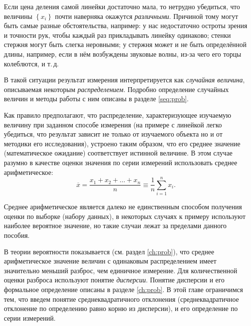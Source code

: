 Если цена деления самой линейки достаточно мала, то нетрудно убедиться, что величины $\left\{ x_{i}\right\} $
почти наверняка окажутся \emph{различными}. Причиной тому могут быть
самые разные обстоятельства, например: у нас недостаточно остроты
зрения и точности рук, чтобы каждый раз прикладывать линейку одинаково;
стенки стержня могут быть слегка неровными; у стержня может и не быть
определённой длины, например, если в нём возбуждены звуковые волны,
из-за чего его торцы колеблются, и т.\,д.

В такой ситуации результат измерения интерпретируется как \emph{случайная величина}, описываемая некоторым \emph{распределением}. Подробно определение случайных величин и методы работы с ним описаны в разделе \ref{seq:prob}.

Как правило предполагают, что распределение, характеризующее изучаемую величину при заданном способе измерения (на примере с линейкой легко убедиться, что результат зависит не только от изучаемого объекта но и от методики его исследования), устроено таким образом, что его среднее значение (математическое ожидание) соответствует истинной величине. 
В этом случае разумно в качестве оценки значения по серии измерений использовать среднее арифметическое:
\begin{equation}
    \overline{x}=\frac{x_{1}+x_{2}+\ldots+x_{n}}{n}\equiv\frac{1}{n}\sum\limits _{i=1}^{n}x_{i}\label{eq:average}.
\end{equation}

Среднее арифметическое является далеко не единственным способом получения оценки по выборке (набору данных), в некоторых случаях к примеру используют наиболее вероятное значение, но такие случаи лежат за пределами данного пособия.

В теории вероятности показывается (см. раздел \ref{ch:prob}), что среднее арифметическое значение величин с одинаковым распределением имеет значительно меньший разброс, чем единичное измерение. Для количественной оценки разброса используют понятие \emph{дисперсии}. Понятие дисперсии и его формальное определение описаны в разделе \ref{ch:prob}. В этой главе ограничимся тем, что введем понятие среднеквадратичного отклонения (среднеквадратичное отклонение по определению равно корню из дисперсии), и его определение по серии измерений.


